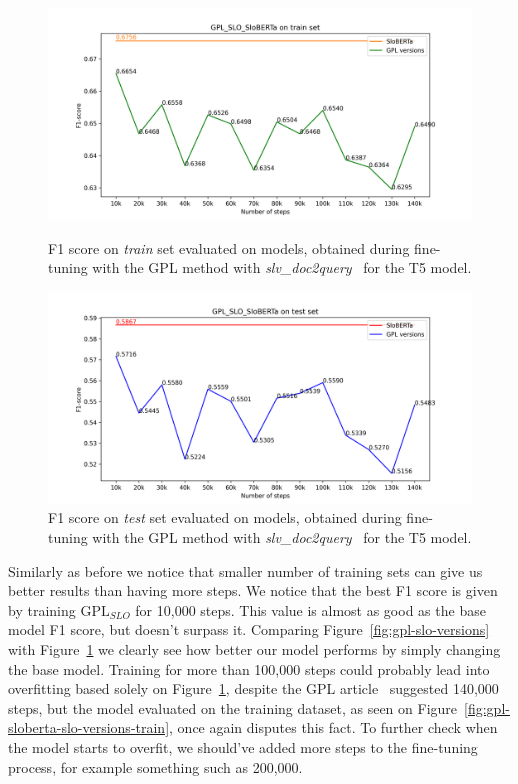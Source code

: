 \documentclass[fleqn,moreauthors,10pt]{ds_report}
\begin{document}
\begin{figure}
    \centering
    \begin{minipage}{0.5\textwidth}
        \centering
        \includegraphics[width=\linewidth]{graphs/GPL_SLO_SloBERTa_train.png}
        \caption{F1 score on \textit{train} set evaluated on models, obtained during fine-tuning with the GPL method with {\it slv\_doc2query}~\cite{boshko} for the T5 model.}
		\label{fig:gpl-sloberta-slo-versions-train}
    \end{minipage}\hfill
    \begin{minipage}{0.5\textwidth}
        \centering
        \includegraphics[width=\linewidth]{graphs/GPL_SLO_SloBERTa_test.png}
        \caption{F1 score on \textit{test} set evaluated on models, obtained during fine-tuning with the GPL method with {\it slv\_doc2query}~\cite{boshko} for the T5 model.}
		\label{fig:gpl-sloberta-slo-versions}
    \end{minipage}
\end{figure}

Similarly as before we notice that smaller number of training sets can give us better results than having more steps. We notice that the best F1 score is given by training $\text{GPL}_{SLO}$ for 10,000 steps. This value is almost as good
as the base model F1 score, but doesn't surpass it. Comparing Figure~\ref{fig:gpl-slo-versions} with Figure~\ref{fig:gpl-sloberta-slo-versions}
we clearly see how better our model performs by simply changing the base model.
Training for more than 100,000 steps could probably lead into overfitting based solely on Figure~\ref{fig:gpl-sloberta-slo-versions}, despite the GPL article~\cite{GPL} suggested 140,000 steps, but the model evaluated on the training dataset, as seen on Figure~\ref{fig:gpl-sloberta-slo-versions-train}, once again disputes this fact.
To further check when the model starts to overfit, we should've added more steps to the fine-tuning process, for example something such as 200,000.
\end{document}
